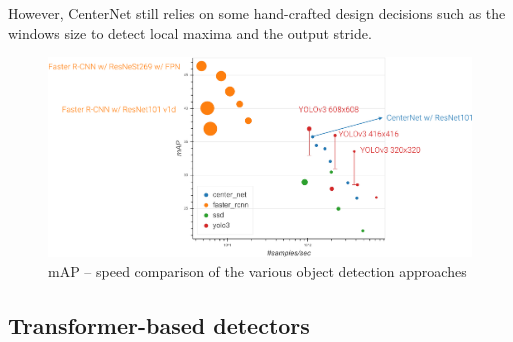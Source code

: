 \begin{description}
\begin{remark}
        However, CenterNet still relies on some hand-crafted design decisions such as the windows size to detect local maxima and the output stride.
    \end{remark}
\end{description}

\begin{figure}[H]
    \centering
    \includegraphics[width=0.75\linewidth]{./img/_object_detection_map_speed_plot.pdf}
    \caption{
        mAP -- speed comparison of the various object detection approaches
    }
\end{figure}


\subsection{Transformer-based detectors}

